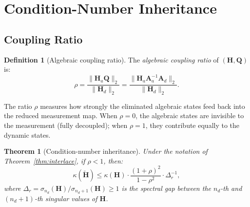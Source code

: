 \documentclass[11pt,a4paper]{article}
\theoremstyle{plain}
\newtheorem{theorem}{Theorem}
\theoremstyle{definition}
\newtheorem{definition}{Definition}
\theoremstyle{remark}
\newcommand{\bfH}{\mathbf{H}}
\newcommand{\bfHt}{\tilde{\mathbf{H}}}
\newcommand{\bfA}{\mathbf{A}}
\newcommand{\bfQ}{\mathbf{Q}}
\newcommand{\norm}[1]{\|#1\|}
\begin{document}
\section{Condition-Number Inheritance}
\label{sec:kappa}

\subsection{Coupling Ratio}

\begin{definition}[Algebraic coupling ratio]
\label{def:rho}
The \emph{algebraic coupling ratio} of $(\bfH, \bfQ)$ is:
\begin{equation}
  \rho = \frac{\norm{\bfH_a\bfQ}_2}{\norm{\bfH_d}_2}
       = \frac{\norm{\bfH_a\bfA_a^{-1}\bfA_d}_2}{\norm{\bfH_d}_2}.
  \label{eq:rho}
\end{equation}
\end{definition}

The ratio $\rho$ measures how strongly the eliminated algebraic
states feed back into the reduced measurement map.
When $\rho = 0$, the algebraic states are invisible to the
measurement (fully decoupled); when $\rho = 1$, they contribute
equally to the dynamic states.

\begin{theorem}[Condition-number inheritance]
\label{thm:kappa}
Under the notation of Theorem~\ref{thm:interlace}, if $\rho < 1$, then:
\begin{equation}
  \kappa(\bfHt) \leq
  \kappa(\bfH) \cdot \frac{(1+\rho)^2}{1-\rho^2} \cdot \Delta_r^{-1},
  \label{eq:kappa_bound}
\end{equation}
where $\Delta_r = \sigma_{n_d}(\bfH)/\sigma_{n_d+1}(\bfH) \geq 1$
is the \emph{spectral gap} between the $n_d$-th and $(n_d+1)$-th
singular values of $\bfH$.
\end{theorem}
\end{document}
